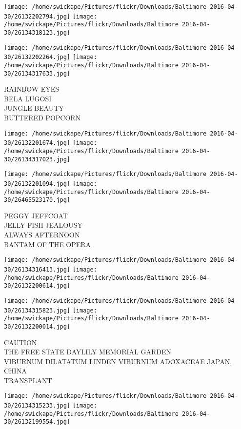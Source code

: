 \documentclass[10pt,letterpaper]{article}
\begin{document}
\texttt{[image: /home/swickape/Pictures/flickr/Downloads/Baltimore 2016-04-30/26132202794.jpg]}
\texttt{[image: /home/swickape/Pictures/flickr/Downloads/Baltimore 2016-04-30/26134318123.jpg]}

\texttt{[image: /home/swickape/Pictures/flickr/Downloads/Baltimore 2016-04-30/26132202264.jpg]}
\texttt{[image: /home/swickape/Pictures/flickr/Downloads/Baltimore 2016-04-30/26134317633.jpg]}

RAINBOW EYES\\
BELA LUGOSI\\
JUNGLE BEAUTY\\
BUTTERED POPCORN\\
\pagebreak

\texttt{[image: /home/swickape/Pictures/flickr/Downloads/Baltimore 2016-04-30/26132201674.jpg]}
\texttt{[image: /home/swickape/Pictures/flickr/Downloads/Baltimore 2016-04-30/26134317023.jpg]}

\texttt{[image: /home/swickape/Pictures/flickr/Downloads/Baltimore 2016-04-30/26132201094.jpg]}
\texttt{[image: /home/swickape/Pictures/flickr/Downloads/Baltimore 2016-04-30/26465523170.jpg]}

PEGGY JEFFCOAT\\
JELLY FISH JEALOUSY\\
ALWAYS AFTERNOON\\
BANTAM OF THE OPERA\\
\pagebreak

\texttt{[image: /home/swickape/Pictures/flickr/Downloads/Baltimore 2016-04-30/26134316413.jpg]}
\texttt{[image: /home/swickape/Pictures/flickr/Downloads/Baltimore 2016-04-30/26132200614.jpg]}

\texttt{[image: /home/swickape/Pictures/flickr/Downloads/Baltimore 2016-04-30/26134315823.jpg]}
\texttt{[image: /home/swickape/Pictures/flickr/Downloads/Baltimore 2016-04-30/26132200014.jpg]}

CAUTION\\
THE FREE STATE DAYLILY MEMORIAL GARDEN\\
VIBURNUM DILATATUM LINDEN VIBURNUM ADOXACEAE JAPAN, CHINA\\
TRANSPLANT\\
\pagebreak

\texttt{[image: /home/swickape/Pictures/flickr/Downloads/Baltimore 2016-04-30/26134315233.jpg]}
\texttt{[image: /home/swickape/Pictures/flickr/Downloads/Baltimore 2016-04-30/26132199554.jpg]}
\end{document}

